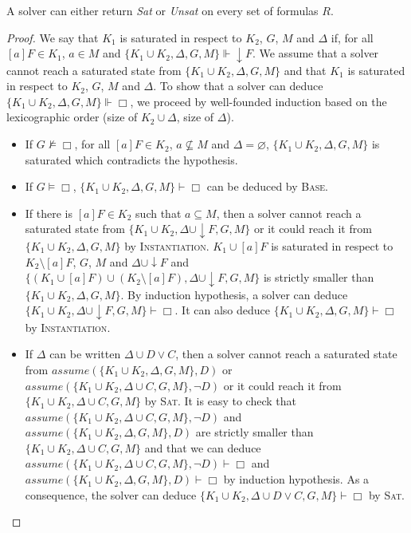 \documentclass[a4paper,11pt]{article}
\newcommand{\A}{\mathit{assume}}
\begin{document}
{\theorem\label{comp} A solver can either return \emph{Sat} or \emph{Unsat} on every set of formulas $R$.}
\begin{proof}
We say that $K_1$ is saturated in respect to $K_2$, $G$, $M$ and $\Delta$ if, for all $[a]F\in K_1$,
$a\in M$ and $\{K_1\cup K_2,\Delta,G,M\}\Vdash\downarrow F$.
We assume that a solver cannot reach a saturated state from
$\{K_1\cup K_2,\Delta,G,M\}$ and that $K_1$ is saturated in respect to $K_2$, $G$, $M$ and $\Delta$.
To show that a solver can deduce $\{K_1\cup K_2,\Delta,G,M\}\Vdash\Box$,
we proceed by well-founded induction based on the lexicographic order (size of $K_2\cup \Delta$,
size of $\Delta$).
\begin{itemize}
 \item If $G\nvDash\Box$, for all $[a]F\in K_2$, $a\nsubseteq M$ and $\Delta=\varnothing$,
$\{K_1\cup K_2,\Delta,G,M\}$ is saturated which contradicts the hypothesis.
 \item If $G\vDash\Box$, $\{K_1\cup K_2,\Delta,G,M\}\vdash\Box$ can be deduced by \textsc{Base}.
 \item If there is $[a]F\in K_2$ such that $a\subseteq M$, then a solver
cannot reach a saturated state from $\{K_1\cup K_2,\Delta\cup\downarrow F,G,M\}$ or it could
reach it from $\{K_1\cup K_2,\Delta,G,M\}$ by \textsc{Instantiation}.
$K_1\cup [a]F$ is saturated in respect to $K_2\setminus[a]F$, $G$, $M$ and $\Delta\cup\downarrow F$
and $\{(K_1\cup [a]F)\cup(K_2\setminus[a]F),\Delta\cup\downarrow F,G,M\}$ is strictly smaller than
$\{K_1\cup K_2,\Delta,G,M\}$. By induction hypothesis,
a solver can deduce $\{K_1\cup K_2,\Delta\cup\downarrow F,G,M\}\vdash\Box$.
It can also deduce $\{K_1\cup K_2,\Delta,G,M\}\vdash\Box$ by \textsc{Instantiation}.
 \item If $\Delta$ can be written $\Delta\cup D\vee C$, then a solver
cannot reach a saturated state from $\A(\{K_1\cup K_2,\Delta,G,M\},D)$ or
$\A(\{K_1\cup K_2,\Delta\cup C,G,M\},\neg D)$ or it could
reach it from $\{K_1\cup K_2,\Delta\cup C,G,M\}$ by \textsc{Sat}.
It is easy to check that $\A(\{K_1\cup K_2,\Delta\cup C,G,M\},\neg D)$ and
$\A(\{K_1\cup K_2,\Delta,G,M\},D)$ are strictly smaller than $\{K_1\cup K_2,\Delta\cup C,G,M\}$
and that we can deduce $\A(\{K_1\cup K_2,\Delta\cup C,G,M\},\neg D)\vdash\Box$ and
$\A(\{K_1\cup K_2,\Delta,G,M\},D)\vdash\Box$ by induction hypothesis.
As a consequence, the solver can deduce $\{K_1\cup K_2,\Delta\cup D\vee C,G,M\}\vdash\Box$ by \textsc{Sat}.
\end{itemize}
\end{proof}
\end{document}
